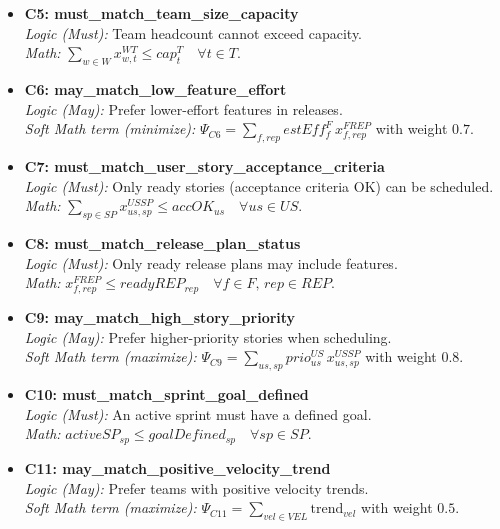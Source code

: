\documentclass[11pt,a4paper]{article}
\begin{document}
\begin{itemize}[leftmargin=2.2em]
  \item \textbf{C5: must\_match\_team\_size\_capacity} \\
  \emph{Logic (Must):} Team headcount cannot exceed capacity. \\
  \emph{Math:} $\displaystyle \sum_{w\in W} x^{WT}_{w,t} \le cap^{T}_{t}\quad \forall t\in T.$

  \item \textbf{C6: may\_match\_low\_feature\_effort} \\
  \emph{Logic (May):} Prefer lower-effort features in releases. \\
  \emph{Soft Math term (minimize):} $\displaystyle \Psi_{C6}=\sum_{f,rep} estEff^{F}_{f}\, x^{FREP}_{f,rep}$ with weight $0.7$.

  \item \textbf{C7: must\_match\_user\_story\_acceptance\_criteria} \\
  \emph{Logic (Must):} Only ready stories (acceptance criteria OK) can be scheduled. \\
  \emph{Math:} $\displaystyle \sum_{sp\in SP} x^{USSP}_{us,sp} \le accOK_{us}\quad \forall us\in US.$

  \item \textbf{C8: must\_match\_release\_plan\_status} \\
  \emph{Logic (Must):} Only ready release plans may include features. \\
  \emph{Math:} $\displaystyle x^{FREP}_{f,rep} \le readyREP_{rep}\quad \forall f\in F,\, rep\in REP.$

  \item \textbf{C9: may\_match\_high\_story\_priority} \\
  \emph{Logic (May):} Prefer higher-priority stories when scheduling. \\
  \emph{Soft Math term (maximize):} $\displaystyle \Psi_{C9}=\sum_{us,sp} prio^{US}_{us}\, x^{USSP}_{us,sp}$ with weight $0.8$.

  \item \textbf{C10: must\_match\_sprint\_goal\_defined} \\
  \emph{Logic (Must):} An active sprint must have a defined goal. \\
  \emph{Math:} $\displaystyle activeSP_{sp} \le goalDefined_{sp}\quad \forall sp\in SP.$

  \item \textbf{C11: may\_match\_positive\_velocity\_trend} \\
  \emph{Logic (May):} Prefer teams with positive velocity trends. \\
  \emph{Soft Math term (maximize):} $\displaystyle \Psi_{C11}=\sum_{vel\in VEL}\mathrm{trend}_{vel}$ with weight $0.5$.
\end{itemize}
\end{document}
